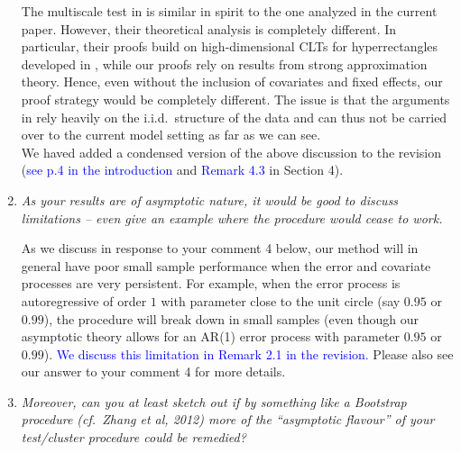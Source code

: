 \documentclass[a4paper,12pt]{article}
\begin{document}
\begin{enumerate}[label=\arabic*.,leftmargin=0.6cm]
The multiscale test in \cite{KhismatullinaVogt2023} is similar in spirit to the one analyzed in the current paper. However, their theoretical analysis is completely different. In particular, their proofs build on high-dimensional CLTs for hyperrectangles developed in \cite{Chernozhukov2017}, while our proofs rely on results from strong approximation theory. Hence, even without the inclusion of covariates and fixed effects, our proof strategy would be completely different. The issue is that the arguments in \cite{KhismatullinaVogt2023} rely heavily on the i.i.d.\ structure of the data and can thus not be carried over to the current model setting as far as we can see. \\
We haved added a condensed version of the above discussion to the revision (\textcolor{blue}{see p.4 in the introduction} and \textcolor{blue}{Remark 4.3} in Section 4). 


\item \textit{As your results are of asymptotic nature, it would be good to discuss limitations -- even give an example where the procedure would cease to work.}  

  As we discuss in response to your comment 4 below, our method will in general have poor small sample performance when the error and covariate processes are very persistent. For example, when the error process is autoregressive of order $1$ with parameter close to the unit circle (say $0.95$ or $0.99$), the procedure will break down in small samples (even though our asymptotic theory allows for an AR(1) error process with parameter $0.95$ or $0.99$). \textcolor{blue}{We discuss this limitation in Remark 2.1 in the revision.} Please also see our answer to your comment 4 for more details.
  

\item \textit{Moreover, can you at least sketch out if by something like a Bootstrap procedure (cf.\ Zhang et al, 2012) more of the ``asymptotic flavour'' of your test/cluster procedure could be remedied?}


\end{enumerate}
\end{document}
